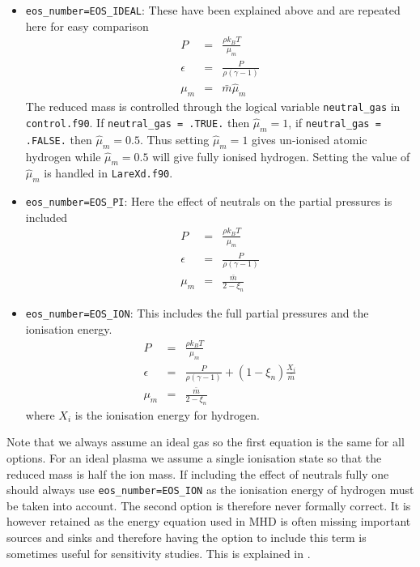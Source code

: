 \documentclass[11pt]{article}
\begin{document}
\begin{itemize}
\item \texttt{eos\_number=EOS\_IDEAL}: These have been explained above and are repeated here for easy comparison
\begin{eqnarray*}
P&=&\frac{\rho k_{B}T}{\mu_m}\\
\epsilon&=&\frac{P}{\rho(\gamma-1)}\\
\mu_m&=&\bar{m}\hat{\mu}_m
\end{eqnarray*}
The reduced mass is controlled through the logical variable {\tt neutral\_gas} in  \texttt{control.f90}. If
{\tt neutral\_gas = .TRUE.} then $\hat{\mu}_m=1$, if {\tt neutral\_gas = .FALSE.} then $\hat{\mu}_m=0.5$.
Thus setting $\hat{\mu}_m=1$ gives un-ionised atomic hydrogen while $\hat{\mu}_m=0.5$ will give fully ionised hydrogen.
Setting the value of $\hat{\mu}_m$ is handled in {\tt LareXd.f90}.

\item \texttt{eos\_number=EOS\_PI}: Here the effect of neutrals on the partial pressures is included
\begin{eqnarray*}
P&=&\frac{\rho k_{B}T}{\mu_m}\\
\epsilon&=&\frac{P}{\rho(\gamma-1)}\\
\mu_m&=&\frac{\bar{m}}{2-\xi_n}
\end{eqnarray*}

\item \texttt{eos\_number=EOS\_ION}: This includes the full partial pressures and the ionisation energy.
\begin{eqnarray*}
P&=&\frac{\rho k_{B}T}{\mu_m}\\
\epsilon&=&\frac{P}{\rho(\gamma-1)}+(1-\xi_n)\frac{X_i}{\bar{m}}\\
\mu_m&=&\frac{\bar{m}}{2-\xi_n}
\end{eqnarray*}
where $X_i$ is the ionisation energy for hydrogen.

\end{itemize}

Note that we always assume an ideal gas so the first equation is the same for all options. For an ideal plasma we assume a single ionisation state so that the reduced mass is half the ion mass. If including the effect of neutrals fully one should always use \texttt{eos\_number=EOS\_ION} as the ionisation energy of hydrogen must be taken into account. The second option is therefore never formally correct. It is however retained as the energy equation used in MHD is often missing important sources and sinks and therefore having the option to include this term is sometimes useful for sensitivity studies. This is explained in \cite{flux-emergence}.
\end{document}
